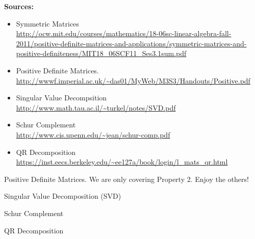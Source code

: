 \documentclass[12pt,letterpaper,headings=normal]{scrartcl}
\begin{document}
\textbf{Sources:}
{\footnotesize
\begin{itemize}
\item Symmetric Matrices\\
\url{http://ocw.mit.edu/courses/mathematics/18-06sc-linear-algebra-fall-2011/positive-definite-matrices-and-applications/symmetric-matrices-and-positive-definiteness/MIT18_06SCF11_Ses3.1sum.pdf}
\item  Positive Definite Matrices.\\ \url{http://wwwf.imperial.ac.uk/~das01/MyWeb/M3S3/Handouts/Positive.pdf}
\item Singular Value Decompsition\\
\url{http://www.math.tau.ac.il/~turkel/notes/SVD.pdf}
\item Schur Complement\\
\url{http://www.cis.upenn.edu/~jean/schur-comp.pdf}
\item QR Decomposition\\
\url{https://inst.eecs.berkeley.edu/~ee127a/book/login/l_mats_qr.html}
\end{itemize}
}

\vspace*{\fill}
Positive Definite Matrices. We are only covering Property 2. Enjoy the others!
\vspace*{\fill}

\vspace*{\fill}
Singular Value Decomposition (SVD)
\vspace*{\fill}

Schur Complement
\vspace*{\fill}

QR Decomposition
\vspace*{\fill}

\end{document}
